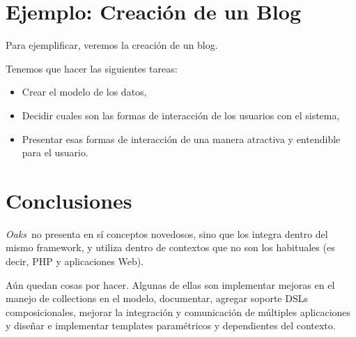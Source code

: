\documentclass[a4paper,10pt]{article}
\newcommand{\PWB}{\emph{Oaks}}
\begin{document}
\section{Ejemplo: Creación de un Blog}
Para ejemplificar, veremos la creación de un blog.

Tenemos que hacer las siguientes tareas:
\begin{itemize}
\item Crear el modelo de los datos,
\item Decidir cuales son las formas de interacción de los usuarios con el sistema,
\item Presentar esas formas de interacción de una manera atractiva y entendible para el usuario.
\end{itemize}





\section{Conclusiones}

\PWB \ no presenta en sí conceptos novedosos, sino que los integra dentro del mismo framework, y utiliza dentro de contextos que no son los habituales (es decir, PHP y aplicaciones Web). 

Aún quedan cosas por hacer. Algunas de ellas son implementar mejoras en el manejo de collections en el modelo, documentar, agregar soporte DSLs composicionales, mejorar la integración y comunicación de múltiples aplicaciones y diseñar e implementar templates paramétricos y dependientes del contexto.



\end{document}
